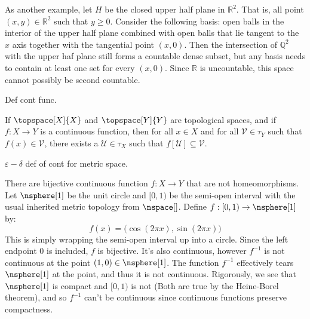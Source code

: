\documentclass{article}                                                        %
\begin{document}
        \begin{example}
            As another example, let $H$ be the closed upper half plane in
            $\mathbb{R}^{2}$. That is, all point $(x,y)\in\mathbb{R}^{2}$ such
            that $y\geq{0}$. Consider the following basis: open balls in the
            interior of the upper half plane combined with open balls that lie
            tangent to the $x$ axis together with the tangential point $(x,0)$.
            Then the intersection of $\mathbb{Q}^{2}$ with the upper haf plane
            still forms a countable dense subset, but any basis needs to contain
            at least one set for every $(x,0)$. Since $\mathbb{R}$ is
            uncountable, this space cannot possibly be second countable.
        \end{example}
        Def cont func.
        \begin{theorem}
            If $\topspace[X]{X}$ and $\topspace[Y]{Y}$ are topological spaces,
            and if $f:X\rightarrow{Y}$ is a continuous function, then for all
            $x\in{X}$ and for all $\mathcal{V}\in\tau_{Y}$ such that
            $f(x)\in\mathcal{V}$, there exists a $\mathcal{U}\in\tau_{X}$ such
            that $f[\mathcal{U}]\subseteq\mathcal{V}$.
        \end{theorem}
        $\varepsilon-\delta$ def of cont for metric space.
        \begin{example}
            There are bijective continuous function $f:X\rightarrow{Y}$ that
            are not homeomorphisms. Let $\nsphere[1]$ be the unit circle and
            $[0,1)$ be the semi-open interval with the usual inherited metric
            topology from $\nspace[]$. Define $f:[0,1)\rightarrow\nsphere[1]$
            by:
            \begin{equation}
                f(x)=\big(\cos(2\pi{x}),\sin(2\pi{x})\big)
            \end{equation}
            This is simply wrapping the semi-open interval up into a circle.
            Since the left endpoint 0 is included, $f$ is bijective. It's also
            continuous, however $f^{\minus{1}}$ is not continuous at the point
            $(1,0)\in\nsphere[1]$. The function $f^{\minus{1}}$ effectively
            tears $\nsphere[1]$ at the point, and thus it is not continuous.
            Rigorously, we see that $\nsphere[1]$ is compact and $[0,1)$ is not
            (Both are true by the Heine-Borel theorem), and so $f^{\minus{1}}$
            can't be continuous since continuous functions preserve compactness.
        \end{example}
\end{document}
